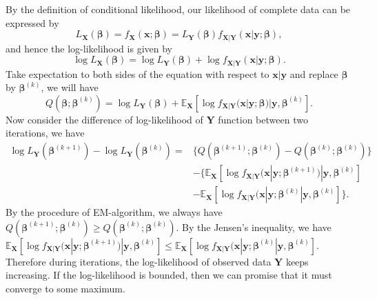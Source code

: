 \documentclass[
  a4paper,
  oneside,
  openany,
  12pt,
  onecolumn]{book}
\theoremstyle{plain}
\theoremstyle{remark}
\begin{document}
By the definition of conditional likelihood, our likelihood of complete
data can be expressed by \[
L_\boldsymbol{X}(\boldsymbol{\beta}) = f_\boldsymbol{X}(\boldsymbol{x};\boldsymbol{\beta})=L_\boldsymbol{Y}(\boldsymbol{\beta})f_{\boldsymbol{X|Y}}(\boldsymbol{x}|\boldsymbol{y};\boldsymbol{\beta}),
\] and hence the log-likelihood is given by \[
\log L_\boldsymbol{X}(\boldsymbol{\beta}) = \log L_\boldsymbol{Y}(\boldsymbol{\beta})+ \log f_{\boldsymbol{X|Y}}(\boldsymbol{x}|\boldsymbol{y};\boldsymbol{\beta}).
\] Take expectation to both sides of the equation with respect to
\(\boldsymbol{x|y}\) and replace \(\boldsymbol{\beta}\) by
\(\boldsymbol{\beta}^{(k)}\), we will have \[
Q(\boldsymbol{\beta};\boldsymbol{\beta}^{(k)}) = \log L_\boldsymbol{Y}(\boldsymbol{\beta}) + \mathbb{E}_\boldsymbol{X}[\log f_{\boldsymbol{X|Y}}(\boldsymbol{x}|\boldsymbol{y};\boldsymbol{\beta})|\boldsymbol{y},\boldsymbol{\beta}^{(k)}].
\] Now consider the difference of log-likelihood of \(\boldsymbol{Y}\)
function between two iterations, we have \[
\begin{align*}
  \log L_\boldsymbol{Y}(\boldsymbol{\beta}^{(k+1)})-\log L_\boldsymbol{Y}(\boldsymbol{\beta}^{(k)}) =
  &\{Q(\boldsymbol{\beta}^{(k+1)};\boldsymbol{\beta}^{(k)})-Q(\boldsymbol{\beta}^{(k)};\boldsymbol{\beta}^{(k)})\}\\
  &-\{\mathbb{E}_\boldsymbol{X}[\log         f_{\boldsymbol{X|Y}}(\boldsymbol{x}|\boldsymbol{y};\boldsymbol{\beta}^{(k+1)})|\boldsymbol{y},\boldsymbol{\beta}^{(k)}]\\
  &-\mathbb{E}_\boldsymbol{X}[\log         f_{\boldsymbol{X|Y}}(\boldsymbol{x}|\boldsymbol{y};\boldsymbol{\beta}^{(k)}|\boldsymbol{y},\boldsymbol{\beta}^{(k)}]\}.
\end{align*}
\] By the procedure of EM-algorithm, we always have
\(Q(\boldsymbol{\beta}^{(k+1)};\boldsymbol{\beta}^{(k)})\geq Q(\boldsymbol{\beta}^{(k)};\boldsymbol{\beta}^{(k)})\).
By the Jensen's inequality, we have
\(\mathbb{E}_\boldsymbol{X}[\log         f_{\boldsymbol{X|Y}}(\boldsymbol{x}|\boldsymbol{y};\boldsymbol{\beta}^{(k+1)})|\boldsymbol{y},\boldsymbol{\beta}^{(k)}] \leq \mathbb{E}_\boldsymbol{X}[\log         f_{\boldsymbol{X|Y}}(\boldsymbol{x}|\boldsymbol{y};\boldsymbol{\beta}^{(k)}|\boldsymbol{y},\boldsymbol{\beta}^{(k)}].\)
Therefore during iterations, the log-likelihood of observed data
\(\boldsymbol{Y}\) keeps increasing. If the log-likelihood is bounded,
then we can promise that it must converge to some maximum.

\end{document}

